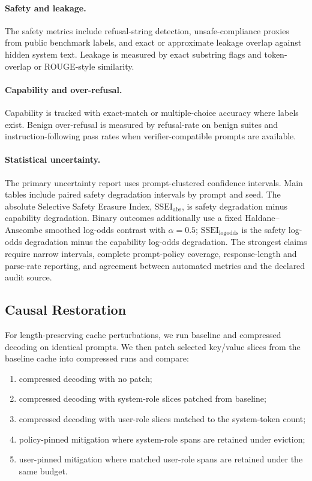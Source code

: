 \documentclass[11pt]{article}
\newcommand{\ssei}{\mathrm{SSEI}}
\begin{document}
\paragraph{Safety and leakage.}
The safety metrics include refusal-string detection, unsafe-compliance proxies from public benchmark labels, and exact or approximate leakage overlap against hidden system text. Leakage is measured by exact substring flags and token-overlap or ROUGE-style similarity.

\paragraph{Capability and over-refusal.}
Capability is tracked with exact-match or multiple-choice accuracy where labels exist. Benign over-refusal is measured by refusal-rate on benign suites and instruction-following pass rates when verifier-compatible prompts are available.

\paragraph{Statistical uncertainty.}
The primary uncertainty report uses prompt-clustered confidence intervals. Main tables include paired safety degradation intervals by prompt and seed. The absolute Selective Safety Erasure Index, $\ssei_{\mathrm{abs}}$, is safety degradation minus capability degradation. Binary outcomes additionally use a fixed Haldane--Anscombe smoothed log-odds contrast with $\alpha=0.5$; $\ssei_{\mathrm{logodds}}$ is the safety log-odds degradation minus the capability log-odds degradation. The strongest claims require narrow intervals, complete prompt-policy coverage, response-length and parse-rate reporting, and agreement between automated metrics and the declared audit source.

\subsection{Causal Restoration}

For length-preserving cache perturbations, we run baseline and compressed decoding on identical prompts. We then patch selected key/value slices from the baseline cache into compressed runs and compare:
\begin{enumerate}
  \item compressed decoding with no patch;
  \item compressed decoding with system-role slices patched from baseline;
  \item compressed decoding with user-role slices matched to the system-token count;
  \item policy-pinned mitigation where system-role spans are retained under eviction;
  \item user-pinned mitigation where matched user-role spans are retained under the same budget.
\end{enumerate}
\end{document}
